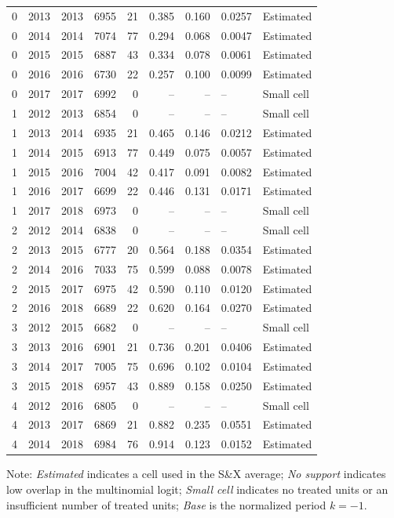 \begin{longtable}{rrrrrrrll}
0 & 2013 & 2013 & 6955 & 21 & 0.385 & 0.160 & 0.0257 & Estimated \\
0 & 2014 & 2014 & 7074 & 77 & 0.294 & 0.068 & 0.0047 & Estimated \\
0 & 2015 & 2015 & 6887 & 43 & 0.334 & 0.078 & 0.0061 & Estimated \\
0 & 2016 & 2016 & 6730 & 22 & 0.257 & 0.100 & 0.0099 & Estimated \\
0 & 2017 & 2017 & 6992 & 0 & -- & -- & -- & Small cell \\
1 & 2012 & 2013 & 6854 & 0 & -- & -- & -- & Small cell \\
1 & 2013 & 2014 & 6935 & 21 & 0.465 & 0.146 & 0.0212 & Estimated \\
1 & 2014 & 2015 & 6913 & 77 & 0.449 & 0.075 & 0.0057 & Estimated \\
1 & 2015 & 2016 & 7004 & 42 & 0.417 & 0.091 & 0.0082 & Estimated \\
1 & 2016 & 2017 & 6699 & 22 & 0.446 & 0.131 & 0.0171 & Estimated \\
1 & 2017 & 2018 & 6973 & 0 & -- & -- & -- & Small cell \\
2 & 2012 & 2014 & 6838 & 0 & -- & -- & -- & Small cell \\
2 & 2013 & 2015 & 6777 & 20 & 0.564 & 0.188 & 0.0354 & Estimated \\
2 & 2014 & 2016 & 7033 & 75 & 0.599 & 0.088 & 0.0078 & Estimated \\
2 & 2015 & 2017 & 6975 & 42 & 0.590 & 0.110 & 0.0120 & Estimated \\
2 & 2016 & 2018 & 6689 & 22 & 0.620 & 0.164 & 0.0270 & Estimated \\
3 & 2012 & 2015 & 6682 & 0 & -- & -- & -- & Small cell \\
3 & 2013 & 2016 & 6901 & 21 & 0.736 & 0.201 & 0.0406 & Estimated \\
3 & 2014 & 2017 & 7005 & 75 & 0.696 & 0.102 & 0.0104 & Estimated \\
3 & 2015 & 2018 & 6957 & 43 & 0.889 & 0.158 & 0.0250 & Estimated \\
4 & 2012 & 2016 & 6805 & 0 & -- & -- & -- & Small cell \\
4 & 2013 & 2017 & 6869 & 21 & 0.882 & 0.235 & 0.0551 & Estimated \\
4 & 2014 & 2018 & 6984 & 76 & 0.914 & 0.123 & 0.0152 & Estimated \\
\end{longtable}
\vspace{-0.35cm}
\noindent\footnotesize Note: \textit{Estimated} indicates a cell used in the S\&X average; \textit{No support} indicates low overlap in the multinomial logit; \textit{Small cell} indicates no treated units or an insufficient number of treated units; \textit{Base} is the normalized period \(k=-1\).
\par\endgroup



